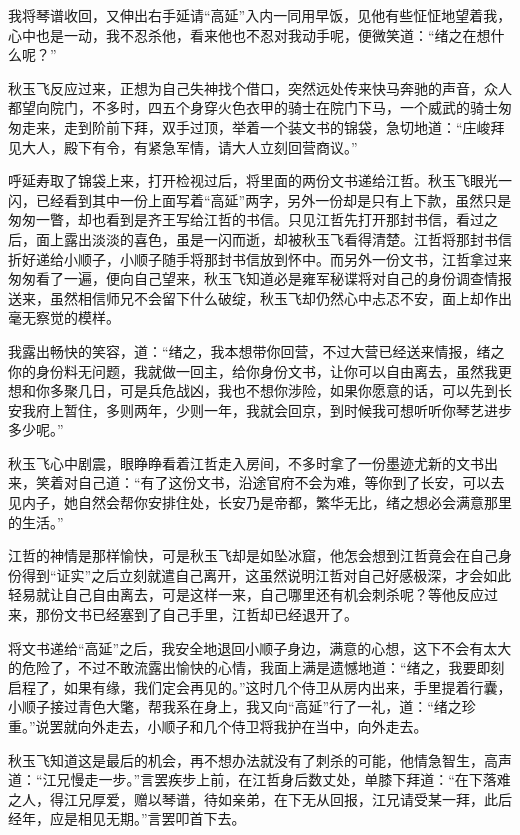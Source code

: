 我将琴谱收回，又伸出右手延请“高延”入内一同用早饭，见他有些怔怔地望着我，心中也是一动，我不忍杀他，看来他也不忍对我动手呢，便微笑道：“绪之在想什么呢？”

秋玉飞反应过来，正想为自己失神找个借口，突然远处传来快马奔驰的声音，众人都望向院门，不多时，四五个身穿火色衣甲的骑士在院门下马，一个威武的骑士匆匆走来，走到阶前下拜，双手过顶，举着一个装文书的锦袋，急切地道：“庄峻拜见大人，殿下有令，有紧急军情，请大人立刻回营商议。”

呼延寿取了锦袋上来，打开检视过后，将里面的两份文书递给江哲。秋玉飞眼光一闪，已经看到其中一份上面写着“高延”两字，另外一份却是只有上下款，虽然只是匆匆一瞥，却也看到是齐王写给江哲的书信。只见江哲先打开那封书信，看过之后，面上露出淡淡的喜色，虽是一闪而逝，却被秋玉飞看得清楚。江哲将那封书信折好递给小顺子，小顺子随手将那封书信放到怀中。而另外一份文书，江哲拿过来匆匆看了一遍，便向自己望来，秋玉飞知道必是雍军秘谍将对自己的身份调查情报送来，虽然相信师兄不会留下什么破绽，秋玉飞却仍然心中忐忑不安，面上却作出毫无察觉的模样。

我露出畅快的笑容，道：“绪之，我本想带你回营，不过大营已经送来情报，绪之你的身份料无问题，我就做一回主，给你身份文书，让你可以自由离去，虽然我更想和你多聚几日，可是兵危战凶，我也不想你涉险，如果你愿意的话，可以先到长安我府上暂住，多则两年，少则一年，我就会回京，到时候我可想听听你琴艺进步多少呢。”

秋玉飞心中剧震，眼睁睁看着江哲走入房间，不多时拿了一份墨迹尤新的文书出来，笑着对自己道：“有了这份文书，沿途官府不会为难，等你到了长安，可以去见内子，她自然会帮你安排住处，长安乃是帝都，繁华无比，绪之想必会满意那里的生活。”

江哲的神情是那样愉快，可是秋玉飞却是如坠冰窟，他怎会想到江哲竟会在自己身份得到“证实”之后立刻就遣自己离开，这虽然说明江哲对自己好感极深，才会如此轻易就让自己自由离去，可是这样一来，自己哪里还有机会刺杀呢？等他反应过来，那份文书已经塞到了自己手里，江哲却已经退开了。

将文书递给“高延”之后，我安全地退回小顺子身边，满意的心想，这下不会有太大的危险了，不过不敢流露出愉快的心情，我面上满是遗憾地道：“绪之，我要即刻启程了，如果有缘，我们定会再见的。”这时几个侍卫从房内出来，手里提着行囊，小顺子接过青色大氅，帮我系在身上，我又向“高延”行了一礼，道：“绪之珍重。”说罢就向外走去，小顺子和几个侍卫将我护在当中，向外走去。

秋玉飞知道这是最后的机会，再不想办法就没有了刺杀的可能，他情急智生，高声道：“江兄慢走一步。”言罢疾步上前，在江哲身后数丈处，单膝下拜道：“在下落难之人，得江兄厚爱，赠以琴谱，待如亲弟，在下无从回报，江兄请受某一拜，此后经年，应是相见无期。”言罢叩首下去。


